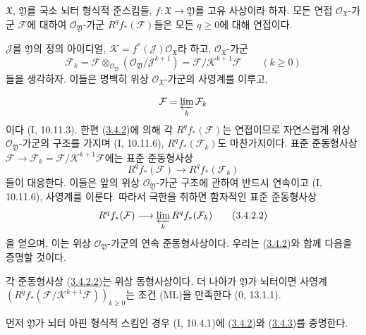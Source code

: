 \begin{theorem}[3.4.2]
\label{III.3.4.2-fr}
$\mathfrak X$, $\mathfrak Y$를 국소 뇌터 형식적 준스킴들,
$f:\mathfrak X\to\mathfrak Y$를 고유 사상이라 하자. 모든 연접
$\mathcal O_{\mathfrak X}$-가군 $\mathcal F$에 대하여
$\mathcal O_{\mathfrak Y}$-가군 $R^qf_*(\mathcal F)$들은 모든
$q\geq0$에 대해 연접이다.
\end{theorem}

$\mathcal J$를 $\mathfrak Y$의 정의 아이디얼,
$\mathcal K=f^*(\mathcal J)\mathcal O_{\mathfrak X}$라 하고,
$\mathcal O_{\mathfrak X}$-가군
\[
\mathcal F_k=\mathcal F\otimes_{\mathcal O_{\mathfrak Y}}
(\mathcal O_{\mathfrak Y}/\mathcal J^{k+1})
=\mathcal F/\mathcal K^{k+1}\mathcal F\qquad(k\geq0)
\tag{3.4.2.1}\label{III.3.4.2.1-fr}
\]
들을 생각하자. 이들은 명백히 위상 $\mathcal O_{\mathfrak X}$-가군의
사영계를 이루고,

\[
\mathcal F=\varprojlim_k\mathcal F_k
\]
이다 (I, 10.11.3). 한편
(\hyperref[III.3.4.2-fr]{3.4.2})에 의해 각
$R^qf_*(\mathcal F)$는 연접이므로 자연스럽게 위상
$\mathcal O_{\mathfrak Y}$-가군의 구조를 가지며 (I, 10.11.6),
$R^qf_*(\mathcal F_k)$도 마찬가지이다. 표준 준동형사상
$\mathcal F\to\mathcal F_k=\mathcal F/\mathcal K^{k+1}\mathcal F$에는
표준 준동형사상
\[
R^qf_*(\mathcal F)\longrightarrow R^qf_*(\mathcal F_k)
\]
들이 대응한다. 이들은 앞의 위상 $\mathcal O_{\mathfrak Y}$-가군 구조에
관하여 반드시 연속이고 (I, 10.11.6), 사영계를 이룬다. 따라서 극한을
취하면 함자적인 표준 준동형사상
\[
R^qf_*(\mathcal F)\longrightarrow\varprojlim_kR^qf_*(\mathcal F_k)
\tag{3.4.2.2}\label{III.3.4.2.2-fr}
\]
을 얻으며, 이는 위상 $\mathcal O_{\mathfrak Y}$-가군의 연속
준동형사상이다. 우리는 (\hyperref[III.3.4.2-fr]{3.4.2})와 함께 다음을
증명할 것이다.

\begin{corollary}[3.4.3]
\label{III.3.4.3-fr}
각 준동형사상 (\hyperref[III.3.4.2.2-fr]{3.4.2.2})는 위상
동형사상이다. 더 나아가 $\mathfrak Y$가 뇌터이면 사영계
$(R^qf_*(\mathcal F/\mathcal K^{k+1}\mathcal F))_{k\geq0}$는
조건 (ML)을 만족한다 (0, 13.1.1).
\end{corollary}

먼저 $\mathfrak Y$가 뇌터 아핀 형식적 스킴인 경우 (I, 10.4.1)에
(\hyperref[III.3.4.2-fr]{3.4.2})와
(\hyperref[III.3.4.3-fr]{3.4.3})를 증명한다.

